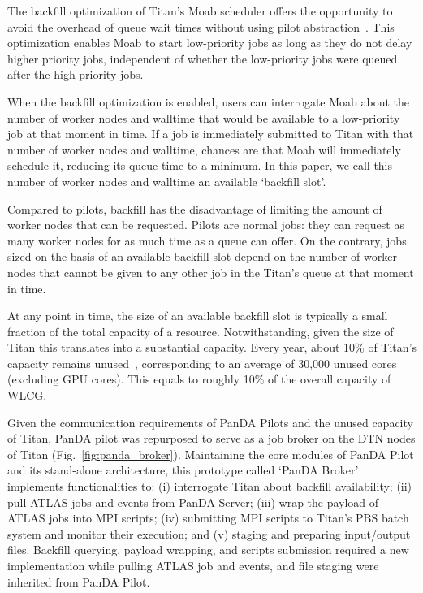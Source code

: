 The backfill optimization of Titan's Moab scheduler offers the opportunity to
avoid the overhead of queue wait times without using pilot
abstraction~\cite{maui_backfill_url}. This optimization enables Moab to start
low-priority jobs as long as they do not delay higher priority jobs,
independent of whether the low-priority jobs were queued after the
high-priority jobs.

When the backfill optimization is enabled, users can interrogate Moab about the
number of worker nodes and walltime that would be available to a low-priority
job at that moment in time. If a job is immediately submitted to Titan with that
number of worker nodes and walltime, chances are that Moab will immediately
schedule it, reducing its queue time to a minimum. In this paper, we call this
number of worker nodes and walltime an available `backfill slot'.

Compared to pilots, backfill has the disadvantage of limiting the amount of
worker nodes that can be requested. Pilots are normal jobs: they can request as
many worker nodes for as much time as a queue can offer. On the contrary, jobs
sized on the basis of an available backfill slot depend on the number of worker
nodes that cannot be given to any other job in the Titan's queue at that moment
in time.

At any point in time, the size of an available backfill slot is typically a
small fraction of the total capacity of a resource. Notwithstanding, given the
size of Titan this translates into a substantial capacity. Every year, about
10\% of Titan's capacity remains unused~\cite{barker2016us}, corresponding to an
average of 30,000 unused cores (excluding GPU cores). This equals to roughly
10\% of the overall capacity of WLCG.

Given the communication requirements of PanDA Pilots and the unused capacity of
Titan, PanDA pilot was repurposed to serve as a job broker on the DTN nodes of
Titan (Fig.~\ref{fig:panda_broker}). Maintaining the core modules of PanDA Pilot
and its stand-alone architecture, this prototype called `PanDA Broker'
implements functionalities to: (i) interrogate Titan about backfill
availability; (ii) pull ATLAS jobs and events from PanDA Server; (iii) wrap the
payload of ATLAS jobs into MPI scripts; (iv) submitting MPI scripts to Titan's
PBS batch system and monitor their execution; and (v) staging and preparing
input/output files. Backfill querying, payload wrapping, and scripts submission
required a new implementation while pulling ATLAS job and events, and file
staging were inherited from PanDA Pilot.

